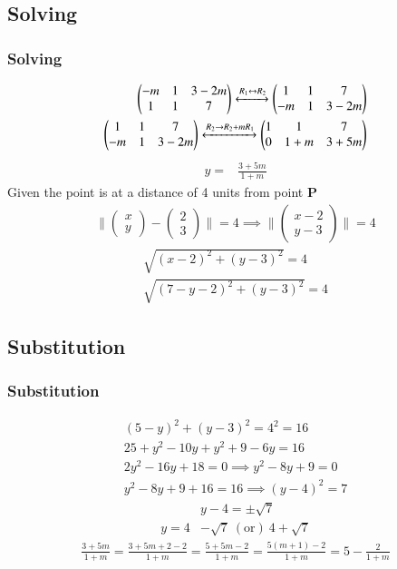\documentclass{beamer}
\providecommand{\brak}[1]{\ensuremath{\left(#1\right)}}
\theoremstyle{remark}
\providecommand{\norm}[1]{\lVert#1\rVert}
\newcommand{\myvec}[1]{\ensuremath{\begin{pmatrix}#1\end{pmatrix}}}
\let\vec\mathbf
\numberwithin{equation}{section}
\begin{document}
\subsection{Solving}
\begin{frame}
\frametitle{Solving}
\begin{align}
\myvec{-m & 1 & 3-2m \\ 1 &1 & 7} \xleftrightarrow{R_1\leftrightarrow R_2} \myvec{1 &1 & 7 \\ -m & 1 & 3-2m}\\
\myvec{1 &1 & 7 \\ -m & 1 & 3-2m}\xleftrightarrow{R_2\rightarrow R_2+mR_1} 
\myvec{1 & 1& 7 \\0 & 1+m & 3+5m}
\end{align}
\begin{align}
y=&\frac{3+5m}{1+m}
\end{align}
Given the point is at a distance of 4 units from point $\vec{P}$
\begin{align}
  \norm{\myvec{x\\y}-\myvec{2\\3}}=4 \implies \norm{\myvec{x-2\\y-3}}=4
\end{align}
\begin{align}
\sqrt{\brak{x-2}^2+{\brak{y-3}^2}}=4  \\
\sqrt{\brak{7-y-2}^2+{\brak{y-3}^2}}=4  
\end{align}
\end{frame}
\subsection{Substitution}
\begin{frame}
\frametitle{Substitution}
\begin{align}
\brak{5-y}^2+{\brak{y-3}^2}=4^2=16 \\
25+y^2-10y+y^2+9-6y=16 \\
2y^2-16y+18=0 \implies y^2-8y+9=0 \\
y^2-8y+9+16=16 \implies \brak{y-4}^2=7 
\end{align}
\begin{align}
&y-4=\pm\sqrt7 \\
y=4&-\sqrt{7}\ \brak{\text{or}}\  4+\sqrt{7}
\end{align}
\begin{align}
\frac{3+5m}{1+m} = \frac{3+5m+2-2}{1+m}= \frac{5+5m-2}{1+m}=\frac{5\brak{m+1}-2}{1+m}=5-\frac{2}{1+m}
\end{align}
\end{frame}
\end{document}

